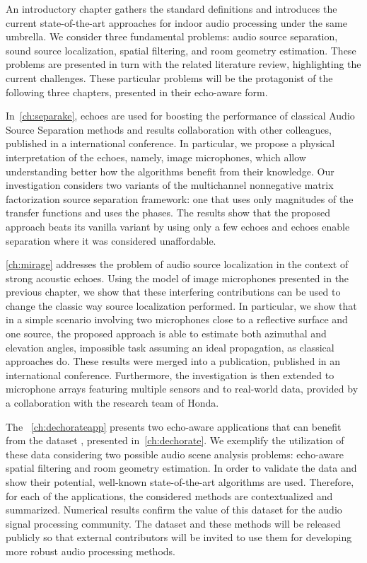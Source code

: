 An introductory chapter gathers the standard definitions and introduces the current state-of-the-art approaches for indoor audio processing under the same umbrella.
We consider three fundamental problems: audio source separation, sound source localization, spatial filtering, and room geometry estimation.
These problems are presented in turn with the related literature review, highlighting the current challenges.
These particular problems will be the protagonist of the following three chapters, presented in their echo-aware form.

In~\cref{ch:separake}, echoes are used for boosting the performance of classical Audio Source Separation methods and results collaboration with other colleagues, published in a international conference.
In particular, we propose a physical interpretation of the echoes, namely, image microphones, which allow understanding better how the algorithms benefit from their knowledge.
Our investigation considers two variants of the multichannel nonnegative matrix factorization source separation framework: one that uses only magnitudes of the transfer functions and uses the phases.
The results show that the proposed approach beats its vanilla variant by using only a few echoes and echoes enable separation where it was considered unaffordable.

\cref{ch:mirage} addresses the problem of audio source localization in the context of strong acoustic echoes. Using the model of image microphones presented in the previous chapter, we show that these interfering contributions can be used to change the classic way source localization performed.
In particular, we show that in a simple scenario involving two microphones close to a reflective surface and one source, the proposed approach is able to estimate both azimuthal and elevation angles, impossible task assuming an ideal propagation, as classical approaches do.
These results were merged into a publication, published in an international conference.
Furthermore, the investigation is then extended to microphone arrays featuring multiple sensors and to real-world data, provided by a collaboration with the research team of Honda.

The ~\cref{ch:dechorateapp} presents two echo-aware applications that can benefit from the dataset \dEchorate, presented in~\cref{ch:dechorate}. We exemplify the utilization of these data considering two possible audio scene analysis problems: echo-aware spatial filtering and room geometry estimation.
In order to validate the data and show their potential, well-known state-of-the-art algorithms are used. Therefore, for each of the applications, the considered methods are contextualized and summarized.
Numerical results confirm the value of this dataset for the audio signal processing community. The dataset and these methods will be released publicly so that external contributors will be invited to use them for developing more robust audio processing methods.

